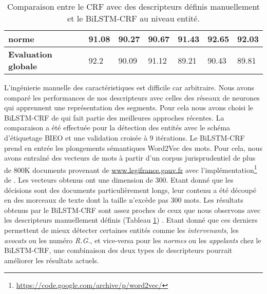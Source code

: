 \begin{table}[!ht]
\begin{tabular}{|l|l|l|l|l|l|l|}
		\textbf{norme}         & 91.08              & 90.27                               & 90.67       & 91.43              & 92.65                & 92.03       \\ \hline
		\noalign{\smallskip}\hline\noalign{\smallskip}
		\textbf{Evaluation globale} & 92.2               & 90.09                               & 91.12       & 89.21              & 90.43                & 89.81       \\ \hline
	\end{tabular}
	\caption{Comparaison entre le CRF avec des descripteurs définis manuellement et le BiLSTM-CRF au niveau entité.}\label{tab:structuration:perf-bilstmcrf}
\end{table}

L'ingénierie manuelle des caractéristiques est difficile car arbitraire. Nous avons comparé les performances de nos descripteurs avec celles des réseaux de neurones qui apprennent une représentation des segments. Pour cela nous avons choisi le BiLSTM-CRF de \citet{lample2016nnner} qui fait partie des meilleures approches récentes. La comparaison a été effectuée pour la détection des entités avec le schéma d'étiquetage BIEO et une validation croisée à 9 itérations. Le BiLSTM-CRF prend en entrée les plongements sémantiques Word2Vec \citep{mikolov2013word2vec} des mots. Pour cela, nous avons entraîné des vecteurs de mots à partir d'un corpus jurisprudentiel de plus de 800K documents provenant de \url{www.legifrance.gouv.fr} avec l'implémentation\footnote{\url{https://code.google.com/archive/p/word2vec/}} de \citet{lemikolov2014word2vec}. Les vecteurs obtenus ont une dimension de 300. Etant donné que les décisions sont des documents particulièrement longs, leur contenu a été découpé en des morceaux de texte dont la taille n'excède pas 300 mots. Les résultats obtenus par le BiLSTM-CRF sont assez proches de ceux que nous observons avec les descripteurs manuellement définis (Tableau \ref{tab:structuration:perf-bilstmcrf}) . Etant donné que ces derniers permettent de mieux détecter certaines entités comme les \textit{intervenants}, les \textit{avocats} ou les numéro \textit{R.G.}, et vice-versa pour les \textit{normes} ou les \textit{appelants} chez le BiLSTM-CRF, une combinaison des deux types de descripteurs pourrait améliorer les résultats actuels. %
 

